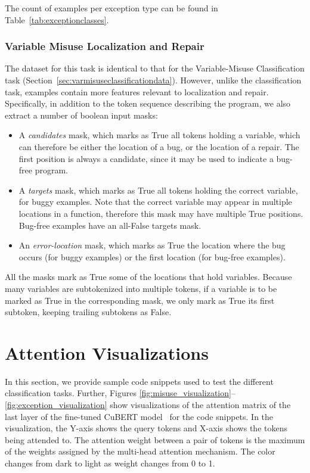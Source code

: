 \documentclass{article}
\begin{document}
The count of examples per exception type can be found in Table~\ref{tab:exceptionclasses}.

\subsubsection{{Variable Misuse Localization and Repair}}
The dataset for this task is identical to that for the Variable-Misuse Classification task (Section~\ref{sec:varmisuseclassificationdata}). However, unlike the classification task, examples contain more features relevant to localization and repair. Specifically, in addition to the token sequence describing the program, we also extract a number of boolean input masks:
\begin{itemize}
    \item A \emph{candidates} mask, which marks as True all tokens holding a variable, which can therefore be either the location of a bug, or the location of a repair. The first position is always a candidate, since it may be used to indicate a bug-free program.
    \item A \emph{targets} mask, which marks as True all tokens holding the correct variable, for buggy examples. Note that the correct variable may appear in multiple locations in a function, therefore this mask may have multiple True positions. Bug-free examples have an all-False targets mask.
    \item An \emph{error-location} mask, which marks as True the location where the bug occurs (for buggy examples) or the first location (for bug-free examples).
\end{itemize}
All the masks mark as True some of the locations that hold variables. Because many variables are subtokenized into multiple tokens, if a variable is to be marked as True in the corresponding mask, we only mark as True its first subtoken, keeping trailing subtokens as False.



\section{Attention Visualizations}
\label{sec:visualizations}

In this section, we provide sample code snippets used to test the different classification tasks. Further, Figures \ref{fig:misuse_visualization}--\ref{fig:exception_visualization} show visualizations of the attention matrix of the last layer of the fine-tuned CuBERT model~\citep{Coenen2019VisualizingAM} for the code snippets. In the visualization, the Y-axis shows the query tokens and X-axis shows the tokens being attended to. The attention weight between a pair of tokens is the maximum of the weights assigned by the multi-head attention mechanism. The color changes from dark to light as weight changes from 0 to 1.
\end{document}
